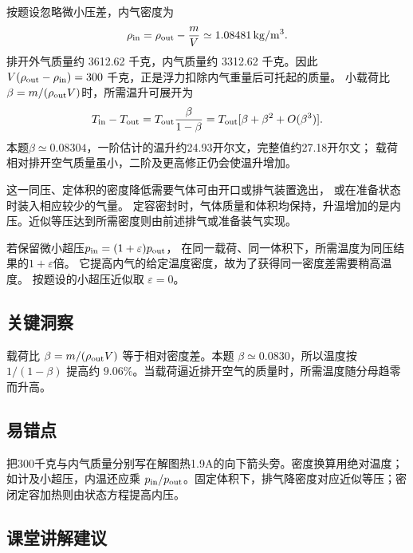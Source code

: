 \documentclass[UTF8,fontset=fandol,a4paper,11pt]{ctexart}
\begin{document}
按题设忽略微小压差，内气密度为
\[
\rho_{\rm in}=\rho_{\rm out}-\frac mV
\simeq1.08481\,\mathrm{kg/m^3}.
\]
排开外气质量约 3612.62 千克，内气质量约 3312.62 千克。因此 $V(\rho_{\rm out}-\rho_{\rm in})=300$ 千克，正是浮力扣除内气重量后可托起的质量。
小载荷比$\beta=m/(\rho_{\rm out}V)$时，所需温升可展开为
\[
T_{\rm in}-T_{\rm out}
=T_{\rm out}\frac{\beta}{1-\beta}
=T_{\rm out}[\beta+\beta^2+O(\beta^3)].
\]
本题$\beta\simeq0.08304$，一阶估计的温升约24.93开尔文，完整值约27.18开尔文；
载荷相对排开空气质量虽小，二阶及更高修正仍会使温升增加。

这一同压、定体积的密度降低需要气体可由开口或排气装置逸出，
或在准备状态时装入相应较少的气量。
定容密封时，气体质量和体积均保持，升温增加的是内压。近似等压达到所需密度则由前述排气或准备装气实现。

若保留微小超压$p_{\rm in}=(1+\varepsilon)p_{\rm out}$，
在同一载荷、同一体积下，所需温度为同压结果的$1+\varepsilon$倍。
它提高内气的给定温度密度，故为了获得同一密度差需要稍高温度。
按题设的小超压近似取 $\varepsilon=0$。




\subsection*{关键洞察}

载荷比 $\beta=m/(\rho_{\rm out}V)$ 等于相对密度差。本题 $\beta\simeq0.0830$，所以温度按 $1/(1-\beta)$ 提高约 $9.06\%$。当载荷逼近排开空气的质量时，所需温度随分母趋零而升高。



\subsection*{易错点}

把300千克与内气质量分别写在解图热1.9A的向下箭头旁。密度换算用绝对温度；如计及小超压，内温还应乘 $p_{\rm in}/p_{\rm out}$。固定体积下，排气降密度对应近似等压；密闭定容加热则由状态方程提高内压。



\subsection*{课堂讲解建议}
\end{document}
